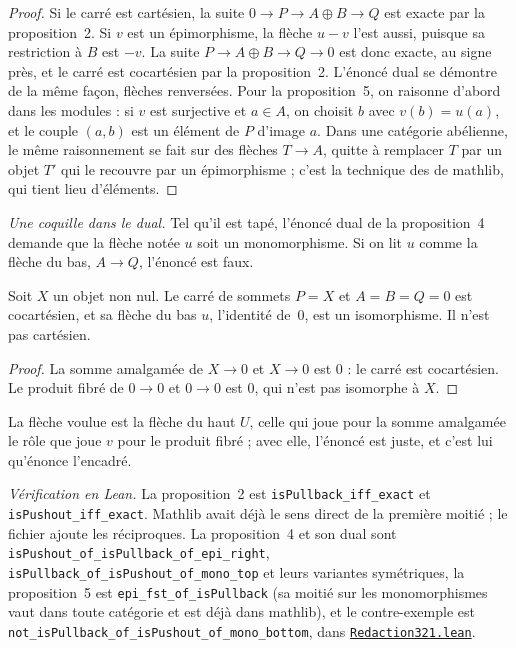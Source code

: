 \begin{proof}
Si le carré est cartésien, la suite $0 \to P \to A \oplus B \to Q$ est exacte par la proposition~2. Si $v$ est un épimorphisme, la flèche $u - v$ l'est aussi, puisque sa restriction à $B$ est $-v$. La suite $P \to A \oplus B \to Q \to 0$ est donc exacte, au signe près, et le carré est cocartésien par la proposition~2. L'énoncé dual se démontre de la même façon, flèches renversées. Pour la proposition~5, on raisonne d'abord dans les modules : si $v$ est surjective et $a \in A$, on choisit $b$ avec $v(b) = u(a)$, et le couple $(a, b)$ est un élément de $P$ d'image $a$. Dans une catégorie abélienne, le même raisonnement se fait sur des flèches $T \to A$, quitte à remplacer $T$ par un objet $T'$ qui le recouvre par un épimorphisme ; c'est la technique des  de mathlib, qui tient lieu d'éléments.
\end{proof}

\emph{Une coquille dans le dual.} Tel qu'il est tapé, l'énoncé dual de la proposition~4 demande que la flèche notée $u$ soit un monomorphisme. Si on lit $u$ comme la flèche du bas, $A \to Q$, l'énoncé est faux.

\begin{contrexemple}
Soit $X$ un objet non nul. Le carré de sommets $P = X$ et $A = B = Q = 0$ est cocartésien, et sa flèche du bas $u$, l'identité de~$0$, est un isomorphisme. Il n'est pas cartésien.
\end{contrexemple}

\begin{proof}
La somme amalgamée de $X \to 0$ et $X \to 0$ est $0$ : le carré est cocartésien. Le produit fibré de $0 \to 0$ et $0 \to 0$ est $0$, qui n'est pas isomorphe à $X$.
\end{proof}

\noindent La flèche voulue est la flèche du haut $U$, celle qui joue pour la somme amalgamée le rôle que joue $v$ pour le produit fibré ; avec elle, l'énoncé est juste, et c'est lui qu'énonce l'encadré.

\noindent\emph{Vérification en Lean.} La proposition~2 est \texttt{isPullback\_iff\_exact} et \texttt{isPushout\_iff\_exact}. Mathlib avait déjà le sens direct de la première moitié ; le fichier ajoute les réciproques. La proposition~4 et son dual sont \texttt{isPushout\_of\_isPullback\_of\_epi\_right}, \texttt{isPullback\_of\_isPushout\_of\_mono\_top} et leurs variantes symétriques, la proposition~5 est \texttt{epi\_fst\_of\_isPullback} (sa moitié sur les monomorphismes vaut dans toute catégorie et est déjà dans mathlib), et le contre-exemple est \texttt{not\_isPullback\_of\_isPushout\_of\_mono\_bottom}, dans \href{\leanblobmain/Redaction321.lean}{\texttt{Redaction321.\allowbreak{}lean}}.

